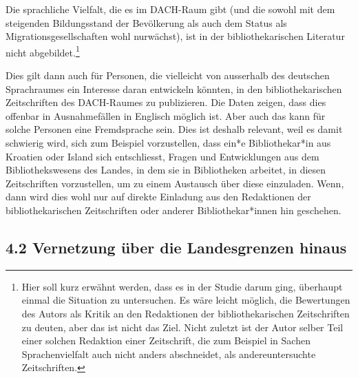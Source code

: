 \documentclass[a4paper,
fontsize=11pt,
oneside,
numbers=noperiodatend,
parskip=half-,
bibliography=totoc,
final
]{scrartcl}
\begin{document}
Die sprachliche Vielfalt, die es im DACH-Raum gibt (und die sowohl mit
dem steigenden Bildungsstand der Bevölkerung als auch dem Status als
Migrationsgesellschaften wohl nur\linebreak wächst), ist in der bibliothekarischen
Literatur nicht abgebildet.\footnote{Hier soll kurz erwähnt werden, dass
  es in der Studie darum ging, überhaupt einmal die Situation zu
  untersuchen. Es wäre leicht möglich, die Bewertungen des Autors als
  Kritik an den Redaktionen der bibliothekarischen Zeitschriften zu
  deuten, aber das ist nicht das Ziel. Nicht zuletzt ist der Autor
  selber Teil einer solchen Redaktion einer Zeitschrift, die zum
  Beispiel in Sachen Sprachenvielfalt auch nicht anders abschneidet, als
  andereuntersuchte Zeitschriften.}

Dies gilt dann auch für Personen, die vielleicht von ausserhalb des
deutschen Sprachraumes ein Interesse daran entwickeln könnten, in den
bibliothekarischen Zeitschriften des DACH-Raumes zu publizieren. Die
Daten zeigen, dass dies offenbar in Ausnahmefällen in Englisch möglich
ist. Aber auch das kann für solche Personen eine Fremdsprache sein. Dies
ist deshalb relevant, weil es damit schwierig wird, sich zum Beispiel
vorzustellen, dass ein*e Bibliothekar*in aus Kroatien oder Island sich
entschliesst, Fragen und Entwicklungen aus dem Bibliothekswesens des
Landes, in dem sie in Bibliotheken arbeitet, in diesen Zeitschriften
vorzustellen, um zu einem Austausch über diese einzuladen. Wenn, dann
wird dies wohl nur auf direkte Einladung aus den Redaktionen der
bibliothekarischen Zeitschriften oder anderer Bibliothekar*innen hin
geschehen.

\hypertarget{vernetzung-uxfcber-die-landesgrenzen-hinaus-1}{%
\subsection{4.2 Vernetzung über die Landesgrenzen
hinaus}\label{vernetzung-uxfcber-die-landesgrenzen-hinaus-1}}
\end{document}
